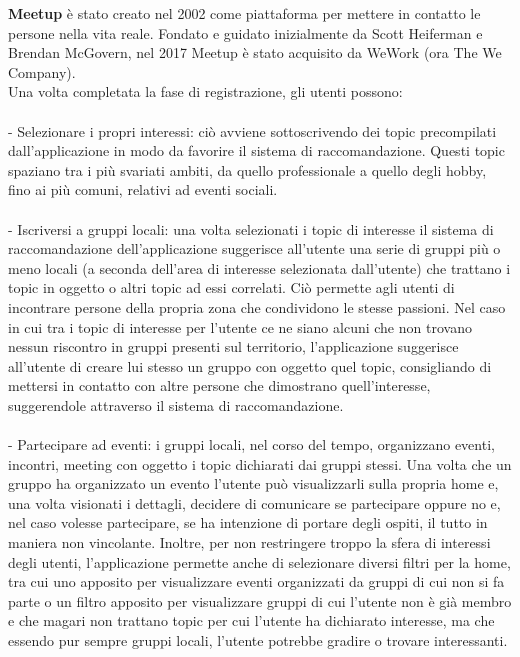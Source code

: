 \documentclass[fleqn,10pt]{SelfArx} %
\begin{document}
{\footnotesize %
\textbf{Meetup} è stato creato nel 2002 come piattaforma per mettere in contatto le persone nella vita reale. Fondato e guidato inizialmente da Scott Heiferman e Brendan McGovern, nel 2017 Meetup è stato acquisito da WeWork (ora The We Company). \\
Una volta completata la fase di registrazione, gli utenti possono: \\
\\
- Selezionare i propri interessi: ciò avviene sottoscrivendo dei topic precompilati dall'applicazione in modo da favorire il sistema di raccomandazione. Questi topic spaziano tra i più svariati ambiti, da quello professionale a quello degli hobby, fino ai più comuni, relativi ad eventi sociali. \\
\\
- Iscriversi a gruppi locali: una volta selezionati i topic di interesse il sistema di raccomandazione dell'applicazione suggerisce all'utente una serie di gruppi più o meno locali (a seconda dell'area di interesse selezionata dall'utente) che trattano i topic in oggetto o altri topic ad essi correlati. Ciò permette agli utenti di incontrare persone della propria zona che condividono le stesse passioni. Nel caso in cui tra i topic di interesse per l'utente ce ne siano alcuni che non trovano nessun riscontro in gruppi presenti sul territorio, l'applicazione suggerisce all'utente di creare lui stesso un gruppo con oggetto quel topic, consigliando di mettersi in contatto con altre persone che dimostrano quell'interesse, suggerendole attraverso il sistema di raccomandazione.\\
\\
- Partecipare ad eventi: i gruppi locali, nel corso del tempo, organizzano eventi, incontri, meeting con oggetto i topic dichiarati dai gruppi stessi. Una volta che un gruppo ha organizzato un evento l'utente può visualizzarli sulla propria home e, una volta visionati i dettagli, decidere di comunicare se partecipare oppure no e, nel caso volesse partecipare, se ha intenzione di portare degli ospiti, il tutto in maniera non vincolante. Inoltre, per non restringere troppo la sfera di interessi degli utenti, l'applicazione permette anche di selezionare diversi filtri per la home, tra cui uno apposito per visualizzare eventi organizzati da gruppi di cui non si fa parte o un filtro apposito per visualizzare gruppi di cui l'utente non è già membro e che magari non trattano topic per cui l'utente ha dichiarato interesse, ma che essendo pur sempre gruppi locali, l'utente potrebbe gradire o trovare interessanti.\\
}
\end{document}
